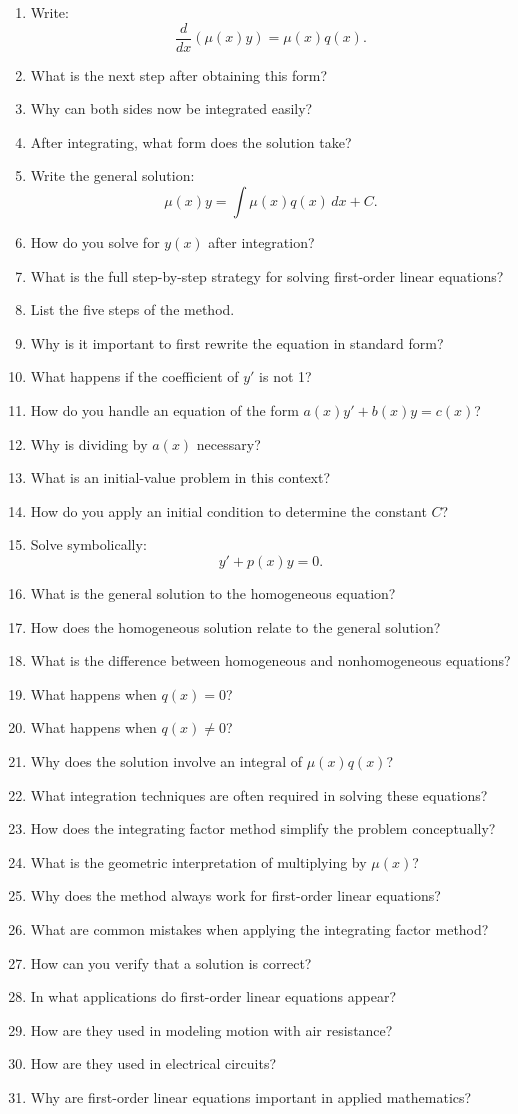 \begin{enumerate}
  \item Write:
    \[
      \frac{d}{dx}(\mu(x)y) = \mu(x)q(x).
    \]
  \item What is the next step after obtaining this form?
  \item Why can both sides now be integrated easily?
  \item After integrating, what form does the solution take?
  \item Write the general solution:
    \[
      \mu(x)y = \int \mu(x)q(x)\,dx + C.
    \]
  \item How do you solve for $y(x)$ after integration?
  \item What is the full step-by-step strategy for solving first-order linear equations?
  \item List the five steps of the method.
  \item Why is it important to first rewrite the equation in standard form?
  \item What happens if the coefficient of $y'$ is not 1?
  \item How do you handle an equation of the form $a(x)y' + b(x)y = c(x)$?
  \item Why is dividing by $a(x)$ necessary?
  \item What is an initial-value problem in this context?
  \item How do you apply an initial condition to determine the constant $C$?
  \item Solve symbolically:
    \[
      y' + p(x)y = 0.
    \]
  \item What is the general solution to the homogeneous equation?
  \item How does the homogeneous solution relate to the general solution?
  \item What is the difference between homogeneous and nonhomogeneous equations?
  \item What happens when $q(x)=0$?
  \item What happens when $q(x)\neq 0$?
  \item Why does the solution involve an integral of $\mu(x)q(x)$?
  \item What integration techniques are often required in solving these equations?
  \item How does the integrating factor method simplify the problem conceptually?
  \item What is the geometric interpretation of multiplying by $\mu(x)$?
  \item Why does the method always work for first-order linear equations?
  \item What are common mistakes when applying the integrating factor method?
  \item How can you verify that a solution is correct?
  \item In what applications do first-order linear equations appear?
  \item How are they used in modeling motion with air resistance?
  \item How are they used in electrical circuits?
  \item Why are first-order linear equations important in applied mathematics?
\end{enumerate}
